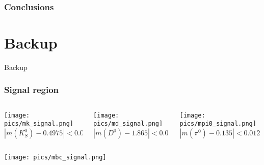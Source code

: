 \documentclass[10 pt,compress,mathserif]{beamer}
\begin{document}
\begin{frame}
 \frametitle{Conclusions}
\end{frame}


\appendix
{}
\setcounter{finalframe}{\value{framenumber}}

\section{Backup}
\begin{frame}
 \begin{center}
  \begin{LARGE}
   Backup
  \end{LARGE}
 \end{center}
\end{frame}

\begin{frame}
 \frametitle{Signal region}
 \begin{small}
 \begin{columns}
  \begin{column}{0.33\textwidth}
  \begin{center}
   \texttt{[image: pics/mk\_signal.png]}\\
   $\left|m(K_S^0)-0.4975\right|<0.009\ \text{GeV}$\\
  \end{center}
  \end{column}
  \begin{column}{0.33\textwidth}
  \begin{center}
   \texttt{[image: pics/md\_signal.png]}\\
   $\left|m(D^0)-1.865\right|<0.013\ \text{GeV}$
  \end{center}
  \end{column}
  \begin{column}{0.33\textwidth}
   \begin{center}
    \texttt{[image: pics/mpi0\_signal.png]}\\
   $\left|m(\pi^0)-0.135\right|<0.012\ \text{GeV}$\\
   \end{center}
  \end{column}
 \end{columns}
 \begin{columns}
  \begin{column}{0.5\textwidth}
  \begin{center}
   \texttt{[image: pics/mbc\_signal.png]}\\

\end{center}
\end{column}
\end{columns}
\end{small}
\end{frame}
\end{document}
